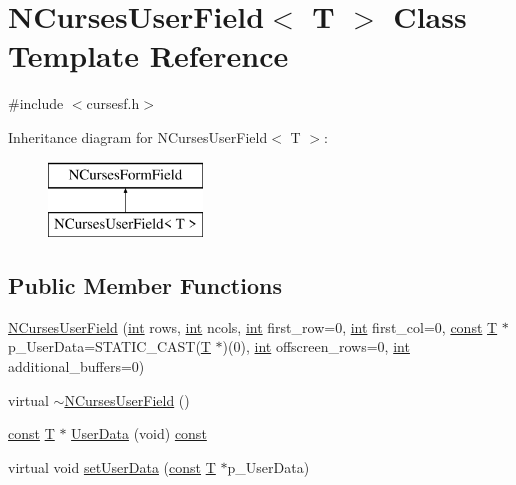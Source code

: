 \hypertarget{class_n_curses_user_field}{\section{N\-Curses\-User\-Field$<$ T $>$ Class Template Reference}
\label{class_n_curses_user_field}
}


{\ttfamily \#include $<$cursesf.\-h$>$}

Inheritance diagram for N\-Curses\-User\-Field$<$ T $>$\-:\begin{figure}[H]
\begin{center}
\leavevmode
\includegraphics[height=2.000000cm]{class_n_curses_user_field}
\end{center}
\end{figure}
\subsection*{Public Member Functions}
\begin{DoxyCompactItemize}
\item 
\hyperlink{class_n_curses_user_field_aaa770e0c3613c6a69d43b06ba9b6e73b}{N\-Curses\-User\-Field} (\hyperlink{term__entry_8h_ad65b480f8c8270356b45a9890f6499ae}{int} rows, \hyperlink{term__entry_8h_ad65b480f8c8270356b45a9890f6499ae}{int} ncols, \hyperlink{term__entry_8h_ad65b480f8c8270356b45a9890f6499ae}{int} first\-\_\-row=0, \hyperlink{term__entry_8h_ad65b480f8c8270356b45a9890f6499ae}{int} first\-\_\-col=0, \hyperlink{term__entry_8h_a57bd63ce7f9a353488880e3de6692d5a}{const} \hyperlink{curses_8priv_8h_a5ef253115820acf7d27f3c5c3b02a0f0}{T} $\ast$p\-\_\-\-User\-Data=S\-T\-A\-T\-I\-C\-\_\-\-C\-A\-S\-T(\hyperlink{curses_8priv_8h_a5ef253115820acf7d27f3c5c3b02a0f0}{T} $\ast$)(0), \hyperlink{term__entry_8h_ad65b480f8c8270356b45a9890f6499ae}{int} offscreen\-\_\-rows=0, \hyperlink{term__entry_8h_ad65b480f8c8270356b45a9890f6499ae}{int} additional\-\_\-buffers=0)
\item 
virtual \hyperlink{class_n_curses_user_field_a99e87c1ef887d2c24644cad6b46962d2}{$\sim$\-N\-Curses\-User\-Field} ()
\item 
\hyperlink{term__entry_8h_a57bd63ce7f9a353488880e3de6692d5a}{const} \hyperlink{curses_8priv_8h_a5ef253115820acf7d27f3c5c3b02a0f0}{T} $\ast$ \hyperlink{class_n_curses_user_field_ad3c3a0e92f0c715e6b33d366f7df4d74}{User\-Data} (void) \hyperlink{term__entry_8h_a57bd63ce7f9a353488880e3de6692d5a}{const} 
\item 
virtual void \hyperlink{class_n_curses_user_field_a742104d0dd15e1855cadb00e26fa5581}{set\-User\-Data} (\hyperlink{term__entry_8h_a57bd63ce7f9a353488880e3de6692d5a}{const} \hyperlink{curses_8priv_8h_a5ef253115820acf7d27f3c5c3b02a0f0}{T} $\ast$p\-\_\-\-User\-Data)
\end{DoxyCompactItemize}

